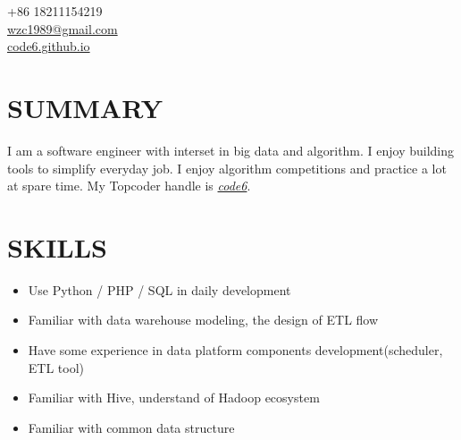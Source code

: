 \documentclass[margin,line]{resume}
\begin{document}
{
	\sc
    \hfill +86 18211154219                  \vspace{0mm}\\\vspace{0mm}%
    \hfill \href{mailto:wzc1989@gmail.com}{wzc1989@gmail.com}  \vspace{0mm}\\\vspace{0mm}%
    \hfill  \href{http://code6.github.io}{code6.github.io}      \vspace{0mm}\\\vspace{-10mm}%

}

\begin{resume}

\vspace{1mm}

    \section{\mysidestyle \textbf{\large{S}\small{UMMARY}}}
    I am a software engineer with interset in big data and algorithm. I enjoy building tools to simplify everyday job. I enjoy algorithm competitions and practice a lot at spare time. My Topcoder handle is \href{http://www.topcoder.com/tc?module=MemberProfile&cr=22758532}{\emph{code6}}.


\sectionline

    \section{\mysidestyle \textbf{\large{S}\small{KILLS}}}\vspace{-0.1mm}
    \begin{itemize}[leftmargin=3mm]
        \item Use Python / PHP / SQL in daily development
        \item Familiar with data warehouse modeling, the design of ETL flow
        \item Have some experience in data platform components development(scheduler, ETL tool)
        \item Familiar with Hive, understand of Hadoop ecosystem
        \item Familiar with common data structure
    \end{itemize}\vspace{-4mm}


\end{resume}
\end{document}
